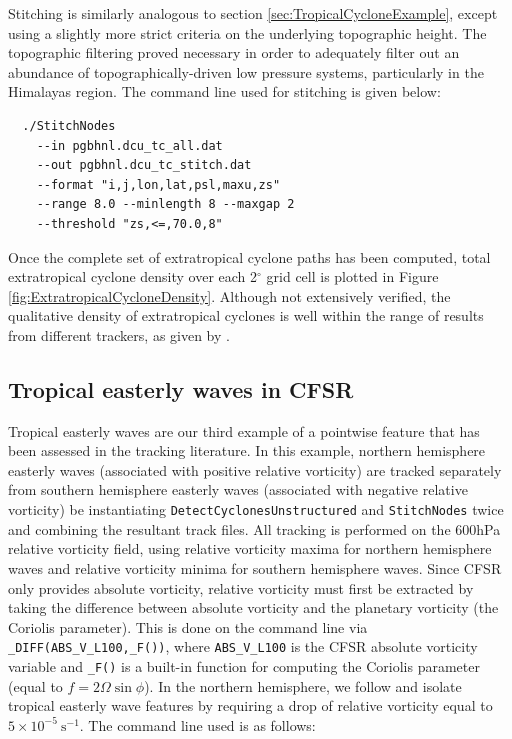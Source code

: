 \documentclass[gmdd, hvmath, online]{copernicus_discussions}
\begin{document}
Stitching is similarly analogous to section \ref{sec:TropicalCycloneExample}, except using a slightly more strict criteria on the underlying topographic height.  The topographic filtering proved necessary in order to adequately filter out an abundance of topographically-driven low pressure systems, particularly in the Himalayas region.  The command line used for stitching is given below:

{\small \begin{verbatim}
  ./StitchNodes
    --in pgbhnl.dcu_tc_all.dat
    --out pgbhnl.dcu_tc_stitch.dat
    --format "i,j,lon,lat,psl,maxu,zs"
    --range 8.0 --minlength 8 --maxgap 2
    --threshold "zs,<=,70.0,8"
\end{verbatim}}

Once the complete set of extratropical cyclone paths has been computed, total extratropical cyclone density over each 2$^\circ$ grid cell is plotted in Figure \ref{fig:ExtratropicalCycloneDensity}.  Although not extensively verified, the qualitative density of extratropical cyclones is well within the range of results from different trackers, as given by \cite{neu2013imilast}.

\subsection{Tropical easterly waves in CFSR} \label{sec:TropicalEasterlyWavesExample}


Tropical easterly waves are our third example of a pointwise feature that has been assessed in the tracking literature.  In this example, northern hemisphere easterly waves (associated with positive relative vorticity) are tracked separately from southern hemisphere easterly waves (associated with negative relative vorticity) be instantiating \texttt{DetectCyclonesUnstructured} and \texttt{StitchNodes} twice and combining the resultant track files.  All tracking is performed on the 600hPa relative vorticity field, using relative vorticity maxima for northern hemisphere waves and relative vorticity minima for southern hemisphere waves.  Since CFSR only provides absolute vorticity, relative vorticity must first be extracted by taking the difference between absolute vorticity and the planetary vorticity (the Coriolis parameter).  This is done on the command line via \texttt{\_DIFF(ABS\_V\_L100,\_F())}, where \texttt{ABS\_V\_L100} is the CFSR absolute vorticity variable and \texttt{\_F()} is a built-in function for computing the Coriolis parameter (equal to $f = 2 \Omega \sin \phi$).  In the northern hemisphere, we follow \cite{thorncroft2001african} and isolate tropical easterly wave features by requiring a drop of relative vorticity equal to $5 \times 10^{-5}\ \mbox{s}^{-1}$.  The command line used is as follows:
\end{document}
